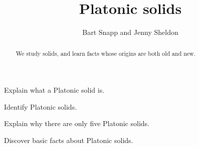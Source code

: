 \documentclass[noauthor,nooutcomes,hints,handout]{ximera}
\title{Platonic solids}
\author{Bart Snapp and Jenny Sheldon}
\begin{document}
\begin{abstract}
  We study solids, and learn facts whose origins are both old and new.
\end{abstract}
\maketitle

\begin{listOutcomes}
\item Explain what a Platonic solid is.
\item Identify Platonic solids.
\item Explain why there are only five Platonic solids.
\item Discover basic facts about Platonic solids.
\end{listOutcomes}
\end{document}
